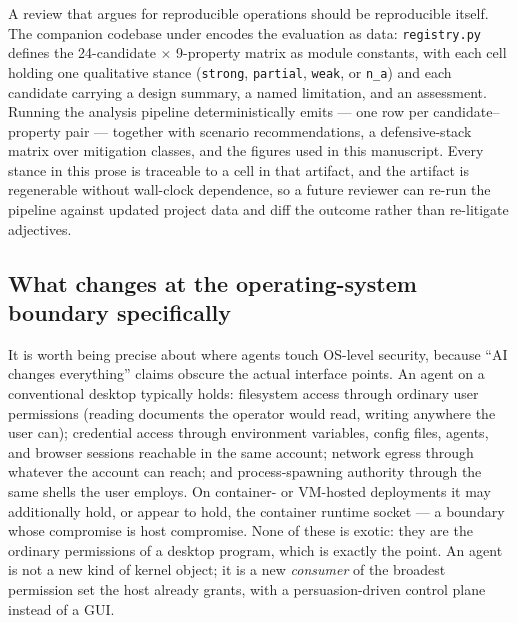 \documentclass[
  english,
  9pt,
]{extarticle}
\begin{document}
A review that argues for reproducible operations should be reproducible
itself. The companion codebase under 
encodes the evaluation as data: \texttt{registry.py} defines the
24-candidate \texorpdfstring{\ensuremath{\times}}{x} 9-property matrix as module constants, with each cell
holding one qualitative stance (\texttt{strong}, \texttt{partial},
\texttt{weak}, or \texttt{n\_a}) and each candidate carrying a design
summary, a named limitation, and an assessment. Running the analysis
pipeline deterministically emits
 --- one row per
candidate--property pair --- together with scenario recommendations, a
defensive-stack matrix over mitigation classes, and the figures used in
this manuscript. Every stance in this prose is traceable to a cell in
that artifact, and the artifact is regenerable without wall-clock
dependence, so a future reviewer can re-run the pipeline against updated
project data and diff the outcome rather than re-litigate adjectives.

\subsection{What changes at the operating-system boundary
specifically}\label{what-changes-at-the-operating-system-boundary-specifically}

It is worth being precise about where agents touch OS-level security,
because ``AI changes everything'' claims obscure the actual interface
points. An agent on a conventional desktop typically holds: filesystem
access through ordinary user permissions (reading documents the operator
would read, writing anywhere the user can); credential access through
environment variables, config files, agents, and browser sessions
reachable in the same account; network egress through whatever the
account can reach; and process-spawning authority through the same
shells the user employs. On container- or VM-hosted deployments it may
additionally hold, or appear to hold, the container runtime socket --- a
boundary whose compromise is host compromise. None of these is exotic:
they are the ordinary permissions of a desktop program, which is exactly
the point. An agent is not a new kind of kernel object; it is a new
\emph{consumer} of the broadest permission set the host already grants,
with a persuasion-driven control plane instead of a GUI.
\end{document}
